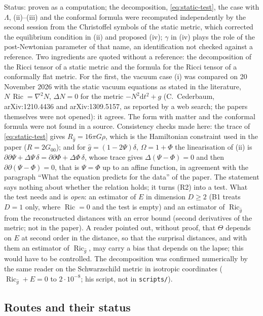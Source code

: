 \documentclass[a4paper,11pt]{article}
\theoremstyle{definition}
\theoremstyle{remark}
\newcommand{\dd}{\mathrm{d}}
\DeclareMathOperator{\Ric}{Ric}
\newcommand{\status}[1]{\par\noindent\textsf{\small Status: #1}\par}
\begin{document}
\status{proven as a computation; the decomposition, \eqref{eq:static-test}, the case with $\Lambda$, (ii)--(iii) and the conformal formula were recomputed independently by the second session from the Christoffel symbols of the static metric, which corrected the equilibrium condition in (ii) and proposed (iv); $\gamma$ in (iv) plays the role of the post-Newtonian parameter of that name, an identification not checked against a reference. Two ingredients are quoted without a reference: the decomposition of the Ricci tensor of a static metric and the formula for the Ricci tensor of a conformally flat metric. For the first, the vacuum case (i) was compared on 20 November 2026 with the static vacuum equations as stated in the literature, $N\,\Ric=\nabla^2N$, $\Delta N=0$ for the metric $-N^2\dd t^2+g$ (C.~Cederbaum, arXiv:1210.4436 and arXiv:1309.5157, as reported by a web search; the papers themselves were not opened): it agrees. The form with matter and the conformal formula were not found in a source. Consistency checks made here: the trace of \eqref{eq:static-test} gives $R_{\hat g}=16\pi G\rho$, which is the Hamiltonian constraint used in the paper ($R=2G_{00}$); and for $\hat g=(1-2\Psi)\delta$, $\Omega=1+\Phi$ the linearisation of (ii) is $\partial\partial\Psi+\Delta\Psi\,\delta=\partial\partial\Phi+\Delta\Phi\,\delta$, whose trace gives $\Delta(\Psi-\Phi)=0$ and then $\partial\partial(\Psi-\Phi)=0$, that is $\Psi=\Phi$ up to an affine function, in agreement with the paragraph ``What the equation predicts for the data'' of the paper. The statement says nothing about whether the relation holds; it turns (R2) into a test. What the test needs and is \emph{open}: an estimator of $E$ in dimension $D\ge2$ (B1 treats $D=1$ only, where $\Ric=0$ and the test is empty) and an estimator of $\Ric_{\hat g}$ from the reconstructed distances with an error bound (second derivatives of the metric; not in the paper). A reader pointed out, without proof, that $\Theta$ depends on $E$ at second order in the distance, so that the surprisal distances, and with them an estimator of $\Ric_{\hat g}$, may carry a bias that depends on the lapse; this would have to be controlled. The decomposition was confirmed numerically by the same reader on the Schwarzschild metric in isotropic coordinates ($\Ric_{\hat g}+E=0$ to $2\cdot10^{-8}$; his script, not in \texttt{scripts/}).}

\subsection{Routes and their status}
\end{document}
